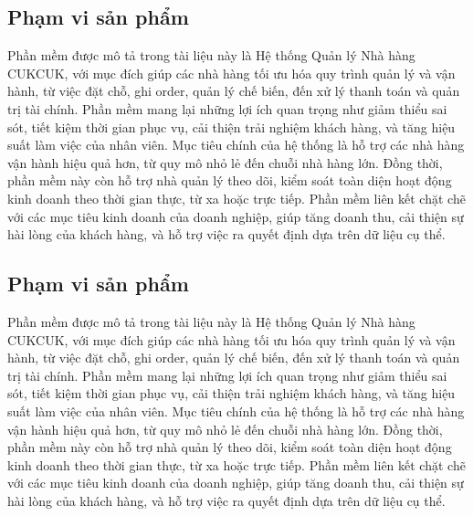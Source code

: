 \subsection{Phạm vi sản phẩm}
Phần mềm được mô tả trong tài liệu này là Hệ thống Quản lý Nhà hàng CUKCUK, với mục đích giúp các nhà hàng tối ưu hóa quy trình quản lý và vận hành, từ việc đặt chỗ, ghi order, quản lý chế biến, đến xử lý thanh toán và quản trị tài chính. Phần mềm mang lại những lợi ích quan trọng như giảm thiểu sai sót, tiết kiệm thời gian phục vụ, cải thiện trải nghiệm khách hàng, và tăng hiệu suất làm việc của nhân viên. Mục tiêu chính của hệ thống là hỗ trợ các nhà hàng vận hành hiệu quả hơn, từ quy mô nhỏ lẻ đến chuỗi nhà hàng lớn. Đồng thời, phần mềm này còn hỗ trợ nhà quản lý theo dõi, kiểm soát toàn diện hoạt động kinh doanh theo thời gian thực, từ xa hoặc trực tiếp. Phần mềm liên kết chặt chẽ với các mục tiêu kinh doanh của doanh nghiệp, giúp tăng doanh thu, cải thiện sự hài lòng của khách hàng, và hỗ trợ việc ra quyết định dựa trên dữ liệu cụ thể.

\subsection{Phạm vi sản phẩm}
Phần mềm được mô tả trong tài liệu này là Hệ thống Quản lý Nhà hàng CUKCUK, với mục đích giúp các nhà hàng tối ưu hóa quy trình quản lý và vận hành, từ việc đặt chỗ, ghi order, quản lý chế biến, đến xử lý thanh toán và quản trị tài chính. Phần mềm mang lại những lợi ích quan trọng như giảm thiểu sai sót, tiết kiệm thời gian phục vụ, cải thiện trải nghiệm khách hàng, và tăng hiệu suất làm việc của nhân viên. Mục tiêu chính của hệ thống là hỗ trợ các nhà hàng vận hành hiệu quả hơn, từ quy mô nhỏ lẻ đến chuỗi nhà hàng lớn. Đồng thời, phần mềm này còn hỗ trợ nhà quản lý theo dõi, kiểm soát toàn diện hoạt động kinh doanh theo thời gian thực, từ xa hoặc trực tiếp. Phần mềm liên kết chặt chẽ với các mục tiêu kinh doanh của doanh nghiệp, giúp tăng doanh thu, cải thiện sự hài lòng của khách hàng, và hỗ trợ việc ra quyết định dựa trên dữ liệu cụ thể.
